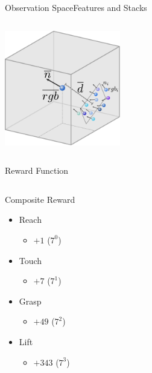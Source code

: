 \begin{frame}{Observation Space}{Features and Stacks}
\begin{columns}
\begin{column}{0.5\textwidth}
            \centering
            \includegraphics[height=5cm]{graphics/octree_features_sketch.pdf}
        \end{column}
    \end{columns}
\end{frame}

\begin{frame}{Reward Function}{}
    \begin{columns}%
        \begin{column}{0.5\textwidth}%
            \begin{block}{Composite Reward}
                \begin{itemize}
                    \item Reach
                          \begin{itemize}
                              \item \(+1\) (\(7^{0}\))
                          \end{itemize}
                    \item Touch
                          \begin{itemize}
                              \item \(+7\) (\(7^{1}\))
                          \end{itemize}
                    \item Grasp
                          \begin{itemize}
                              \item \(+49\) (\(7^{2}\))
                          \end{itemize}
                    \item Lift
                          \begin{itemize}
                              \item \(+343\) (\(7^{3}\))
                          \end{itemize}
                \end{itemize}
            \end{block}

\end{column}
\end{columns}
\end{frame}
